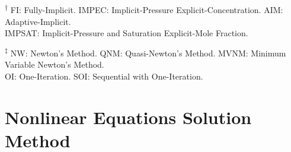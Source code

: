 \begin{table}[h]
\begin{threeparttable}
	\begin{tablenotes}
	\small
	\item [\textsuperscript{$\dag$}] FI: Fully-Implicit. IMPEC: Implicit-Pressure Explicit-Concentration. AIM: Adaptive-Implicit.\\
		\phantom{x}\hspace{0.1cm}IMPSAT: Implicit-Pressure and Saturation Explicit-Mole Fraction.
	\item [\textsuperscript{$\ddag$}] NW: Newton's Method. QNM: Quasi-Newton's Method. MVNM: Minimum Variable Newton's Method.\\
		\phantom{x}\hspace{0.1cm} OI: One-Iteration. SOI: Sequential with One-Iteration.
	\end{tablenotes}
	\end{threeparttable}
\end{table}%

\section{Nonlinear Equations Solution Method}

